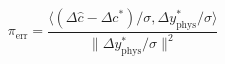 \documentclass{article}
\begin{document}
\fontsize{22}{29}\selectfont
\[
\pi_{\mathrm{err}}=\frac{\langle(\Delta\hat c-\Delta c^*)/\sigma,\Delta y^*_{\mathrm{phys}}/\sigma\rangle}{\|\Delta y^*_{\mathrm{phys}}/\sigma\|^2}
\]
\end{document}

